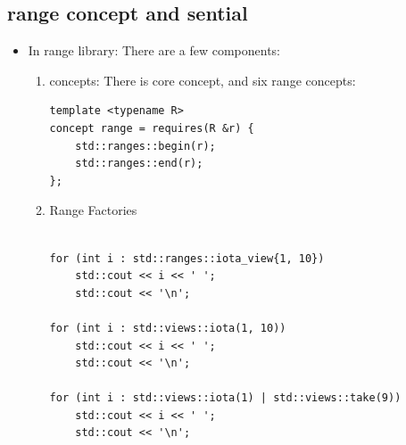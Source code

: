 \documentclass[a4paper,11pt,twoside]{book}
\begin{document}
\subsection{range concept and sential}
\begin{itemize}
\item In range library: There are a few components:
\begin{enumerate}
		\item concepts: There is core concept, and six range concepts:

\begin{lstlisting}
template <typename R>
concept range = requires(R &r) {
    std::ranges::begin(r);
    std::ranges::end(r);
};
\end{lstlisting}

		\item Range Factories 
\begin{lstlisting}

for (int i : std::ranges::iota_view{1, 10})
    std::cout << i << ' ';
    std::cout << '\n';

for (int i : std::views::iota(1, 10))
    std::cout << i << ' ';
    std::cout << '\n';
 
for (int i : std::views::iota(1) | std::views::take(9))
    std::cout << i << ' ';
    std::cout << '\n';
\end{lstlisting}

\end{enumerate}
\end{itemize}
\end{document}
